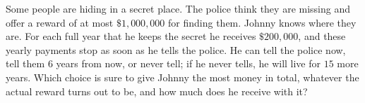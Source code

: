 Some people are hiding in a secret place. The police think they are missing and offer a reward of at most $\$1{,}000{,}000$ for finding them. Johnny knows where they are. For each full year that he keeps the secret he receives $\$200{,}000$, and these yearly payments stop as soon as he tells the police. He can tell the police now, tell them $6$ years from now, or never tell; if he never tells, he will live for $15$ more years. Which choice is sure to give Johnny the most money in total, whatever the actual reward turns out to be, and how much does he receive with it?
